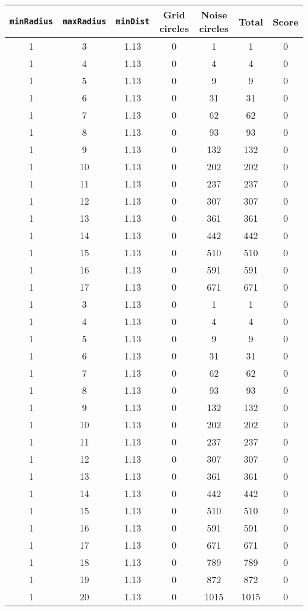 \documentclass[letterpaper, 12pt]{article}
\begin{document}
\begin{longtable}{|c|c|c|c|c|c|c|}
\hline
\textbf{\texttt{minRadius}} & \textbf{\texttt{maxRadius}} & \textbf{\texttt{minDist}} & \textbf{Grid circles} & \textbf{Noise circles} & \textbf{Total} & \textbf{Score} \\
\hline
1 & 3 & 1.13 & 0 & 1 & 1 & 0 \\
\hline
1 & 4 & 1.13 & 0 & 4 & 4 & 0 \\
\hline
1 & 5 & 1.13 & 0 & 9 & 9 & 0 \\
\hline
1 & 6 & 1.13 & 0 & 31 & 31 & 0 \\
\hline
1 & 7 & 1.13 & 0 & 62 & 62 & 0 \\
\hline
1 & 8 & 1.13 & 0 & 93 & 93 & 0 \\
\hline
1 & 9 & 1.13 & 0 & 132 & 132 & 0 \\
\hline
1 & 10 & 1.13 & 0 & 202 & 202 & 0 \\
\hline
1 & 11 & 1.13 & 0 & 237 & 237 & 0 \\
\hline
1 & 12 & 1.13 & 0 & 307 & 307 & 0 \\
\hline
1 & 13 & 1.13 & 0 & 361 & 361 & 0 \\
\hline
1 & 14 & 1.13 & 0 & 442 & 442 & 0 \\
\hline
1 & 15 & 1.13 & 0 & 510 & 510 & 0 \\
\hline
1 & 16 & 1.13 & 0 & 591 & 591 & 0 \\
\hline
1 & 17 & 1.13 & 0 & 671 & 671 & 0 \\
\hline
1 & 3 & 1.13 & 0 & 1 & 1 & 0 \\
\hline
1 & 4 & 1.13 & 0 & 4 & 4 & 0 \\
\hline
1 & 5 & 1.13 & 0 & 9 & 9 & 0 \\
\hline
1 & 6 & 1.13 & 0 & 31 & 31 & 0 \\
\hline
1 & 7 & 1.13 & 0 & 62 & 62 & 0 \\
\hline
1 & 8 & 1.13 & 0 & 93 & 93 & 0 \\
\hline
1 & 9 & 1.13 & 0 & 132 & 132 & 0 \\
\hline
1 & 10 & 1.13 & 0 & 202 & 202 & 0 \\
\hline
1 & 11 & 1.13 & 0 & 237 & 237 & 0 \\
\hline
1 & 12 & 1.13 & 0 & 307 & 307 & 0 \\
\hline
1 & 13 & 1.13 & 0 & 361 & 361 & 0 \\
\hline
1 & 14 & 1.13 & 0 & 442 & 442 & 0 \\
\hline
1 & 15 & 1.13 & 0 & 510 & 510 & 0 \\
\hline
1 & 16 & 1.13 & 0 & 591 & 591 & 0 \\
\hline
1 & 17 & 1.13 & 0 & 671 & 671 & 0 \\
\hline
1 & 18 & 1.13 & 0 & 789 & 789 & 0 \\
\hline
1 & 19 & 1.13 & 0 & 872 & 872 & 0 \\
\hline
1 & 20 & 1.13 & 0 & 1015 & 1015 & 0 \\
\hline
\end{longtable}
\end{document}
